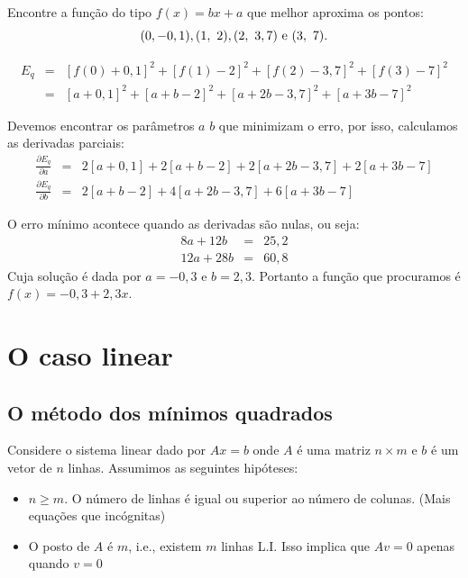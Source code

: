 \begin{ex}Encontre a função do tipo $f(x)=bx+a$ que melhor aproxima os pontos:
  \begin{equation*}
    (0,-0,1), (1,~2), (2,~3,7) ~ \hbox{e} ~(3,~7).  
  \end{equation*}
\end{ex}
\begin{sol}
\begin{eqnarray*}
E_q&=&[f(0)+0,1]^2+[f(1)-2]^2+[f(2)-3,7]^2+[f(3)-7]^2\\
&=&[a+0,1]^2+[a+b-2]^2+[a+2b-3,7]^2+[a+3b-7]^2
\end{eqnarray*}

Devemos encontrar os parâmetros $a$ $b$ que minimizam o erro, por isso, calculamos as derivadas parciais:
\begin{eqnarray*}
\frac{\partial E_q}{\partial a}&=&2[a+0,1]+2[a+b-2]+2[a+2b-3,7]+2[a+3b-7]\\
\frac{\partial E_q}{\partial b}&=&2[a+b-2]+4[a+2b-3,7]+6[a+3b-7]
\end{eqnarray*}



O erro mínimo acontece quando as derivadas são nulas, ou seja:
\begin{eqnarray*}
8a+12b&=&25,2\\
12a+28b&=&60,8
\end{eqnarray*}
Cuja solução é dada por $a=-0,3$ e $b=2,3$.
Portanto a função que procuramos é $f(x)=-0,3 +2,3x$.  
\end{sol}



\section{O caso linear}

\subsection{O método dos mínimos quadrados}

Considere o sistema linear dado por
$Ax=b$
onde $A$ é uma matriz $n\times m$ e $b$ é um vetor de $n$ linhas. Assumimos as seguintes hipóteses:
\begin{itemize}
\item $n\geq m$. O número de linhas é igual ou superior ao número de colunas. (Mais equações que incógnitas)
\item O posto de $A$ é $m$, i.e., existem $m$ linhas L.I. Isso implica que $Av=0$ apenas quando $v=0$
\end{itemize}

